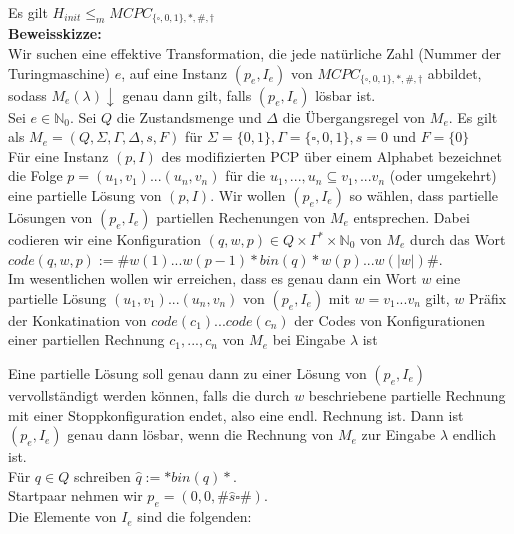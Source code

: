 
\begin{lemma}{}
    Es gilt $H_{init} \leq_m MCPC_{\{\square, 0,1\},*,\#,\dagger}$ \\

    \textbf{Beweisskizze:} \\
    Wir suchen eine effektive Transformation, die jede natürliche Zahl (Nummer der Turingmaschine) $e$, auf eine 
    Instanz $(p_e,I_e)$ von $MCPC_{\{\square, 0,1\},*,\#,\dagger}$ abbildet, sodass $M_e(\lambda)\downarrow$ genau dann gilt,
    falls $(p_e,I_e)$ lösbar ist. \\

    Sei $e \in \mathbb{N}_0$. Sei $Q$ die Zustandsmenge und $\Delta$ die Übergangsregel von $M_e$.
    Es gilt als $M_e=(Q,\Sigma, \Gamma, \Delta, s, F)$ für $\Sigma = \{0,1\}, \Gamma = \{\square,0,1\}, s=0$ und $F=\{0\}$ \\

    
    Für eine Instanz $(p,I)$ des modifizierten PCP über einem Alphabet bezeichnet die Folge 
    $p = (u_1,v_1)...(u_n,v_n)$ für die $u_1,...,u_n \subseteq v_1,...v_n$ (oder umgekehrt) eine partielle Lösung von
    $(p,I)$. Wir wollen $(p_e,I_e)$ so wählen, dass partielle Lösungen von $(p_e,I_e)$ partiellen Rechenungen von $M_e$ entsprechen. 
    Dabei codieren wir eine Konfiguration $(q,w,p) \in Q \times \Gamma^* \times \mathbb{N}_0$ von $M_e$ durch das Wort
    $code(q,w,p) := \#w(1)...w(p-1)*bin(q)*w(p)...w(\vert w \vert)\#$. \\

    Im wesentlichen wollen wir erreichen, dass es genau dann ein Wort $w$ eine partielle Lösung $(u_1,v_1)...(u_n,v_n)$
    von $(p_e,I_e)$ mit $w = v_1...v_n$ gilt, $w$ Präfix der Konkatination von $code(c_1)...code(c_n)$ der Codes von Konfigurationen
    einer partiellen Rechnung $c_1,...,c_n$ von $M_e$ bei Eingabe $\lambda$ ist

    Eine partielle Lösung soll genau dann zu einer Lösung von $(p_e,I_e)$ vervollständigt werden können, falls die durch $w$ beschriebene 
    partielle Rechnung mit einer Stoppkonfiguration endet, also eine endl. Rechnung ist. Dann ist $(p_e, I_e)$ genau dann lösbar, wenn 
    die Rechnung von $M_e$ zur Eingabe $\lambda$ endlich ist. \\

    Für $q \in Q$ schreiben $\hat{q} := * bin(q) *.$ \\
    Startpaar nehmen wir $p_e = (0,0,\# \hat{s} \square \#)$. \\
    Die Elemente von $I_e$ sind die folgenden:
    

\end{lemma}
